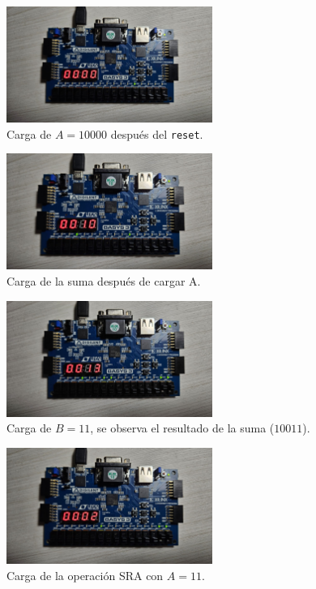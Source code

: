 \begin{figure}[H]
    \centering
    \includegraphics[width=0.6\textwidth]{img/fpga1.png}
    \caption{Carga de $A=10000$ después del \texttt{reset}.}
    \label{fig:fpga1}
\end{figure}

\begin{figure}[H]
    \centering
    \includegraphics[width=0.6\textwidth]{img/fpga2.png}
    \caption{Carga de la suma después de cargar A.}
    \label{fig:fpga2}
\end{figure}

\begin{figure}[H]
    \centering
    \includegraphics[width=0.6\textwidth]{img/fpga3.png}
    \caption{Carga de $B=11$, se observa el resultado de la suma ($10011$).}
    \label{fig:fpga3}
\end{figure}

\begin{figure}[H]
    \centering
    \includegraphics[width=0.6\textwidth]{img/fpga4.png}
    \caption{Carga de la operación SRA con $A=11$.}
    \label{fig:fpga4}
\end{figure}

